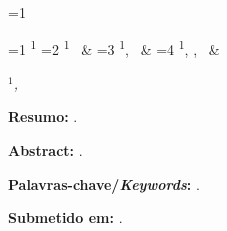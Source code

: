 \newpage
\ifnum\value{linguagemdocumento}=1

    \begin{center}

        \hfill

        \vspace{1cm}

        {\Large \textbf{\titulonotatecnica}}

        \hfill
        \vspace{.5cm}

        {\large \ifnum\value{numerodeautores}=1 \autornotatecnica\textsuperscript{1} %
            \else \ifnum\value{numerodeautores}=2 \autornotatecnica\textsuperscript{1} \, \&  \segundoautor%
                \else \ifnum\value{numerodeautores}=3 \autornotatecnica\textsuperscript{1}, \segundoautor \, \& \terceiroautor%
                    \else \ifnum\value{numerodeautores}=4 \autornotatecnica\textsuperscript{1}, \segundoautor, \terceiroautor \, \& \quartoautor%
                        \fi
                    \fi
                \fi
            \fi
        }

        \hfill
        \vspace{.5cm}

        \(^1\)\textit{\filiacaoautordanota, \emailautor}

        \vspace{1.5cm}

        \begin{minipage}{15cm}
            \textbf{Resumo:} \resumonotatecnica.%
        \end{minipage}

        \vspace{1.5cm}

        \begin{minipage}{15cm}
            \textbf{Abstract:} \abstractnotatecnica.%
        \end{minipage}


        \vspace{1.5cm}

        \begin{minipage}{15cm}
            \textbf{Palavras-chave/\textit{Keywords}:} \keywordsnotatecnica.%
        \end{minipage}

        \vspace{1.5cm}

        \begin{minipage}{15cm}
            \textbf{Submetido em:}  \datanotatecnica.%
        \end{minipage}


\end{center}
